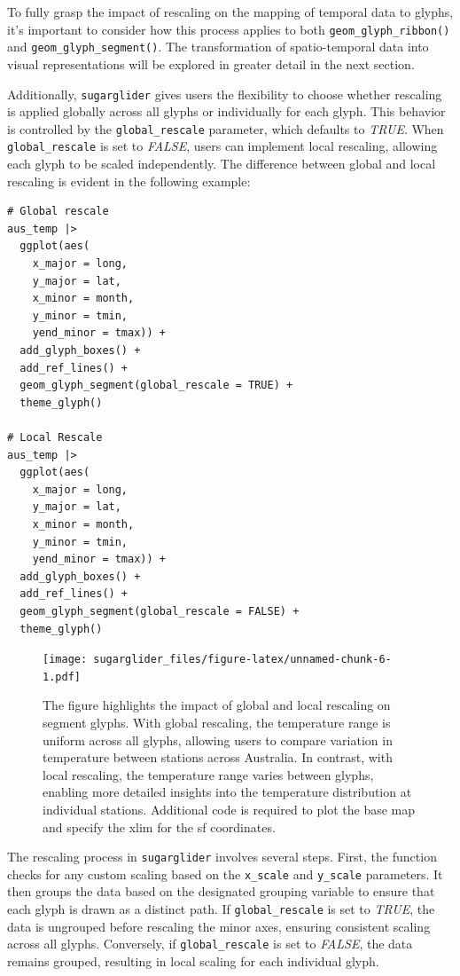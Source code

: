 To fully grasp the impact of rescaling on the mapping of temporal data to glyphs, it's important to consider how this process applies to both \texttt{geom\_glyph\_ribbon()} and \texttt{geom\_glyph\_segment()}. The transformation of spatio-temporal data into visual representations will be explored in greater detail in the next section.

Additionally, \texttt{sugarglider} gives users the flexibility to choose whether rescaling is applied globally across all glyphs or individually for each glyph. This behavior is controlled by the \texttt{global\_rescale} parameter, which defaults to \emph{TRUE}. When \texttt{global\_rescale} is set to \emph{FALSE}, users can implement local rescaling, allowing each glyph to be scaled independently. The difference between global and local rescaling is evident in the following example:

\begin{verbatim}
# Global rescale
aus_temp |>
  ggplot(aes(
    x_major = long, 
    y_major = lat, 
    x_minor = month, 
    y_minor = tmin, 
    yend_minor = tmax)) +
  add_glyph_boxes() +
  add_ref_lines() +
  geom_glyph_segment(global_rescale = TRUE) +
  theme_glyph()

# Local Rescale
aus_temp |>
  ggplot(aes(
    x_major = long, 
    y_major = lat, 
    x_minor = month, 
    y_minor = tmin, 
    yend_minor = tmax)) +
  add_glyph_boxes() +
  add_ref_lines() +
  geom_glyph_segment(global_rescale = FALSE) +
  theme_glyph()
\end{verbatim}

\begin{figure}
\centering
\texttt{[image: sugarglider\_files/figure-latex/unnamed-chunk-6-1.pdf]}
\caption{\label{fig:unnamed-chunk-6}The figure highlights the impact of global and local rescaling on segment glyphs. With global rescaling, the temperature range is uniform across all glyphs, allowing users to compare variation in temperature between stations across Australia. In contrast, with local rescaling, the temperature range varies between glyphs, enabling more detailed insights into the temperature distribution at individual stations. Additional code is required to plot the base map and specify the xlim for the sf coordinates.}
\end{figure}

The rescaling process in \texttt{sugarglider} involves several steps. First, the function checks for any custom scaling based on the \texttt{x\_scale} and \texttt{y\_scale} parameters. It then groups the data based on the designated grouping variable to ensure that each glyph is drawn as a distinct path. If \texttt{global\_rescale} is set to \emph{TRUE}, the data is ungrouped before rescaling the minor axes, ensuring consistent scaling across all glyphs. Conversely, if \texttt{global\_rescale} is set to \emph{FALSE}, the data remains grouped, resulting in local scaling for each individual glyph.

